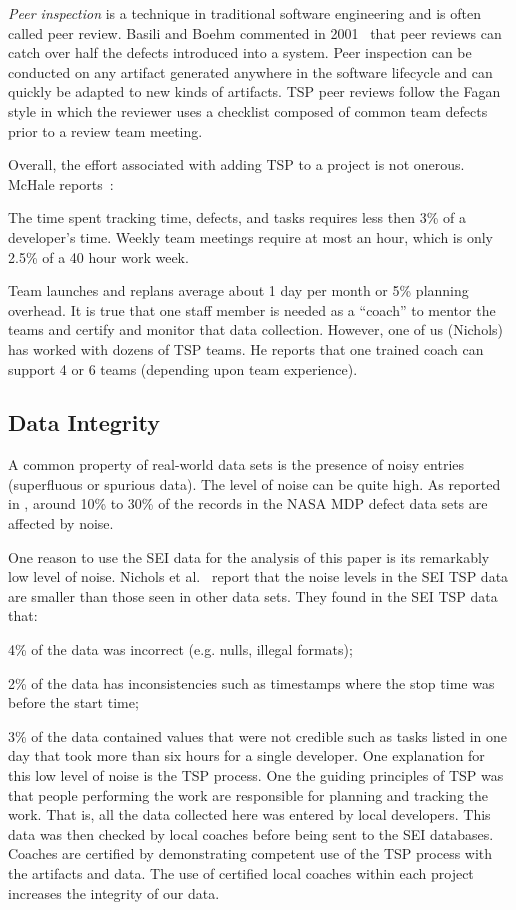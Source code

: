 {\em Peer inspection} is a  technique in
traditional software engineering and is often called peer review.
 Basili and Boehm   commented in 2001~\cite{boehm01} 
that peer reviews can catch over half the defects introduced into a system.
Peer inspection can be conducted on any artifact generated anywhere in the software
lifecycle and can quickly be adapted to new kinds of artifacts. TSP peer reviews follow the Fagan style in which the reviewer uses a checklist composed of common team defects prior to a review team meeting. 
 
Overall, the   effort associated with adding TSP to a project is not onerous. McHale reports~\cite{mchale02}:
\bi
\item
 The time spent  tracking time, defects, and tasks requires less then 3\% of a developer's time. Weekly team meetings  require at most an hour, which is
only 2.5\% of a 40 hour work week. 
\item
Team launches and replans average about 1 day per month or 5\% planning overhead.
\ei
It is true that one staff member is needed as a ``coach'' to mentor the teams
and certify and monitor that data collection. However, one of us (Nichols) has worked with dozens of TSP teams. He reports that one  trained coach can support 4 or 6 teams (depending upon team experience).
 
 
\subsection{Data Integrity}

A common property of real-world data sets is the presence
of noisy entries (superfluous  or spurious data). 
The level of noise can be quite high. As reported
in \cite{shepperd12}, around
10\% to 30\%
of the records in the NASA MDP defect data sets are
affected by noise. 

One reason to use the SEI data for the analysis of this paper is its remarkably low level of noise.
Nichols et al.~\cite{shirai14}  report that
the noise levels in the SEI TSP data are smaller than those seen
in other data sets. They found in the SEI TSP data that:\bi 
\item
4\% of the data was incorrect (e.g. nulls, illegal formats);
\item  2\% of the data has inconsistencies such as timestamps
where the stop time was before the start time;
\item 3\% of the data contained values that were not credible
such as tasks listed in one day that took more than six hours for a single developer.
\ei 
One explanation for this low level of noise is the TSP process.
One the guiding principles of TSP was that  people performing the work are  responsible for planning and tracking the work. That is,  all the data collected here was entered
by local developers. This data was then checked by local coaches before being sent to the SEI
databases. Coaches are certified by demonstrating competent use of the TSP process with the artifacts and data.
The use of certified local coaches within each project increases the integrity of our data.


